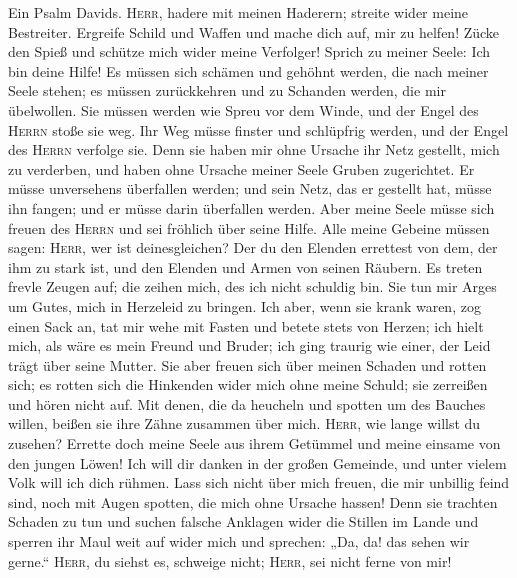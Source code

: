  Ein Psalm Davids. \textsc{Herr}, hadere mit meinen
Haderern; streite wider meine Bestreiter.  Ergreife Schild
und Waffen und mache dich auf, mir zu helfen!  Zücke den
Spieß und schütze mich wider meine Verfolger! Sprich zu meiner Seele:
Ich bin deine Hilfe!  Es müssen sich schämen und gehöhnt
werden, die nach meiner Seele stehen; es müssen zurückkehren und zu
Schanden werden, die mir übelwollen.  Sie müssen werden
wie Spreu vor dem Winde, und der Engel des \textsc{Herrn} stoße sie weg.
 Ihr Weg müsse finster und schlüpfrig werden, und der
Engel des \textsc{Herrn} verfolge sie.  Denn sie haben mir
ohne Ursache ihr Netz gestellt, mich zu verderben, und haben ohne
Ursache meiner Seele Gruben zugerichtet.  Er müsse
unversehens überfallen werden; und sein Netz, das er gestellt hat, müsse
ihn fangen; und er müsse darin überfallen werden.  Aber
meine Seele müsse sich freuen des \textsc{Herrn} und sei fröhlich über
seine Hilfe.  Alle meine Gebeine müssen sagen:
\textsc{Herr}, wer ist deinesgleichen? Der du den Elenden errettest von
dem, der ihm zu stark ist, und den Elenden und Armen von seinen Räubern.
 Es treten frevle Zeugen auf; die zeihen mich, des ich
nicht schuldig bin.  Sie tun mir Arges um Gutes, mich in
Herzeleid zu bringen.  Ich aber, wenn sie krank waren,
zog einen Sack an, tat mir wehe mit Fasten und betete stets von Herzen;
 ich hielt mich, als wäre es mein Freund und Bruder; ich
ging traurig wie einer, der Leid trägt über seine Mutter.
 Sie aber freuen sich über meinen Schaden und rotten
sich; es rotten sich die Hinkenden wider mich ohne meine Schuld; sie
zerreißen und hören nicht auf.  Mit denen, die da
heucheln und spotten um des Bauches willen, beißen sie ihre Zähne
zusammen über mich.  \textsc{Herr}, wie lange willst du
zusehen? Errette doch meine Seele aus ihrem Getümmel und meine einsame
von den jungen Löwen!  Ich will dir danken in der großen
Gemeinde, und unter vielem Volk will ich dich rühmen. 
Lass sich nicht über mich freuen, die mir unbillig feind sind, noch mit
Augen spotten, die mich ohne Ursache hassen!  Denn sie
trachten Schaden zu tun und suchen falsche Anklagen wider die Stillen im
Lande  und sperren ihr Maul weit auf wider mich und
sprechen: „Da, da! das sehen wir gerne.``  \textsc{Herr},
du siehst es, schweige nicht; \textsc{Herr}, sei nicht ferne von mir!
